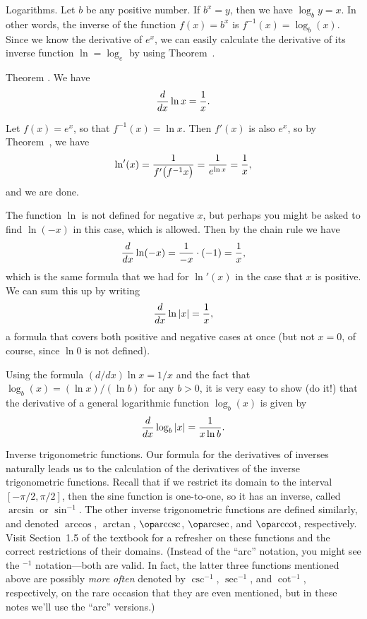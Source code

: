\medskip\boldlabel Logarithms. Let $b$ be any positive number. If $b^x = y$, then we have $\log_b y = x$.
In other words, the inverse of the function $f(x) = b^x$ is $f^{-1}(x) = \log_b (x)$. Since we know
the derivative of $e^x$, we can easily calculate the derivative of its inverse function $\ln = \log_e$
by using Theorem~{\thmderivinverse}.

\proclaim Theorem \advthm. We have
$${d\over dx} \ln x = {1\over x}.$$

\proof Let $f(x) = e^x$, so that $f^{-1}(x) = \ln x$. Then $f'(x)$ is also $e^x$,
so by Theorem~{\thmderivinverse}, we have
$$\ln'(x) = {1\over f'\bigl(f^{-1} x\bigr)} = {1\over e^{\ln x}} = {1\over x},$$
and we are done.\slug

The function $\ln$ is not defined for negative $x$, but perhaps you might be asked to find
$\ln(-x)$ in this case, which is allowed. Then by the chain rule we have
$${d\over dx} \ln(-x) = {1\over -x} \cdot (-1) = {1\over x},$$
which is the same formula that we had
for $\ln'(x)$ in the case that $x$ is positive. We can sum this up by writing
$${d\over dx} \ln|x| = {1\over x},$$
a formula that covers both positive and negative cases at once (but not $x=0$, of course, since $\ln 0$ is
not defined).

Using the formula $(d/dx)\ln x = 1/x$ and the fact that $\log_b(x) = (\ln x)/(\ln b)$ for any $b>0$,
it is very easy to show (do it!) that the derivative of a general logarithmic
function $\log_b(x)$ is given by
$${d\over dx} \log_b|x| = {1\over x\ln b}.$$

\medskip\boldlabel Inverse trigonometric functions. Our formula for the derivatives of inverses naturally
leads us to the calculation of the derivatives of the inverse trigonometric functions. Recall that
if we restrict its domain to the interval $[-\pi/2, \pi/2]$, then the sine function is one-to-one,
so it has an inverse, called $\arcsin$ or $\sin^{-1}$. The other inverse trigonometric functions are defined
similarly, and denoted $\arccos$, $\arctan$, $\arccsc$, $\arcsec$, and $\arccot$, respectively. Visit
Section~1.5 of the textbook for a refresher on these functions and the correct restrictions of their domains.
(Instead of the ``arc'' notation, you might see the $^{-1}$ notation---both are valid. In fact,
the latter three functions mentioned above are possibly {\it more often}
denoted by $\csc^{-1}$, $\sec^{-1}$, and
$\cot^{-1}$, respectively, on the rare occasion that they are even mentioned,
but in these notes we'll use the ``arc'' versions.)

